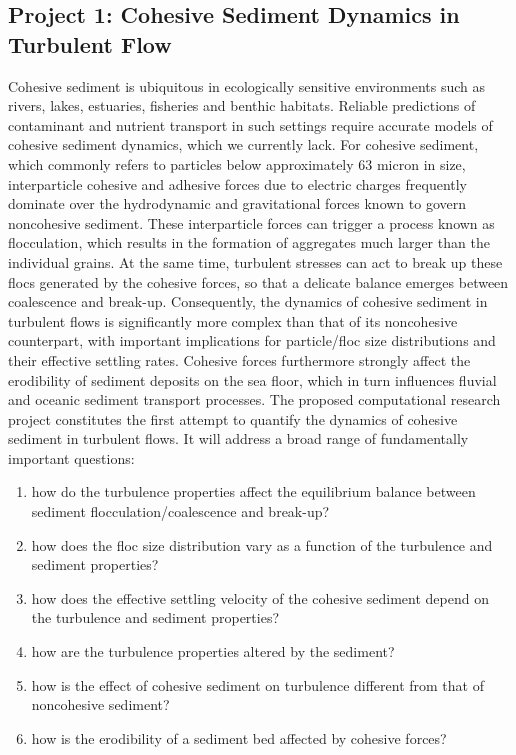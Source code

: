 \documentclass[10pt]{article}
\begin{document}
\subsection*{Project 1: Cohesive Sediment Dynamics in Turbulent Flow}
Cohesive sediment is ubiquitous in ecologically sensitive environments such as rivers,
lakes, estuaries, fisheries and benthic habitats. Reliable predictions of contaminant and nutrient
transport in such settings require accurate models of cohesive sediment dynamics, which we currently lack. For cohesive sediment, which commonly refers to particles below approximately 63 micron in size, interparticle cohesive and adhesive forces due to electric charges frequently dominate over the hydrodynamic and gravitational forces known to govern noncohesive sediment. These interparticle forces can trigger a process known as flocculation, which results in the formation of aggregates much larger than the individual grains. At the same time, turbulent stresses can act to break up these flocs generated by the cohesive forces, so that a delicate balance emerges between coalescence and break-up. Consequently, the dynamics of cohesive sediment in turbulent flows is significantly more complex than that of its noncohesive counterpart, with important implications for particle/floc size distributions and their effective settling rates. Cohesive forces furthermore strongly affect the erodibility of sediment deposits on the sea floor, which in turn influences fluvial and oceanic sediment transport processes. The proposed computational research project constitutes the first attempt to quantify the dynamics of cohesive sediment in turbulent  flows. It will address a broad range of fundamentally important questions:

\begin{enumerate}
\item how do the turbulence properties affect the equilibrium balance between sediment 
flocculation/coalescence and break-up?
\item how does the floc size distribution vary as a function of the turbulence and sediment properties?
\item how does the effective settling velocity of the cohesive sediment depend on the turbulence and sediment properties?
\item how are the turbulence properties altered by the sediment?
\item how is the effect of cohesive sediment on turbulence different from that of noncohesive sediment?
\item how is the erodibility of a sediment bed affected by cohesive forces?
\end{enumerate}
\end{document}
